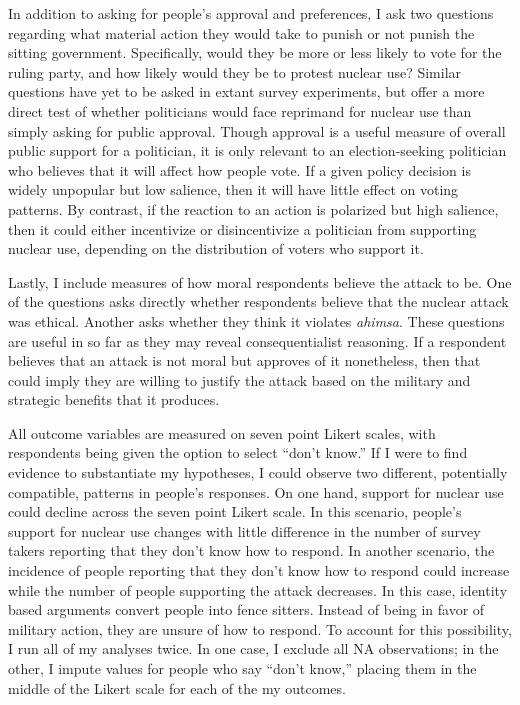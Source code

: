 \documentclass[12pt]{article}
\begin{document}
In addition to asking for people's approval and preferences, I ask two questions regarding what material action they would take to punish or not punish the sitting government. Specifically, would they be more or less likely to vote for the ruling party, and how likely would they be to protest nuclear use? Similar questions have yet to be asked in extant survey experiments, but offer a more direct test of whether politicians would face reprimand for nuclear use than simply asking for public approval. Though approval is a useful measure of overall public support for a politician, it is only relevant to an election-seeking politician who believes that it will affect how people vote. If a given policy decision is widely unpopular but low salience, then it will have little effect on voting patterns. By contrast, if the reaction to an action is polarized but high salience, then it could either incentivize or disincentivize a politician from supporting nuclear use, depending on the distribution of voters who support it. 

Lastly, I include measures of how moral respondents believe the attack to be. One of the questions asks directly whether respondents believe that the nuclear attack was ethical. Another asks whether they think it violates \textit{ahimsa}. These questions are useful in so far as they may reveal consequentialist reasoning. If a respondent believes that an attack is not moral but approves of it nonetheless, then that could imply they are willing to justify the attack based on the military and strategic benefits that it produces.

All outcome variables are measured on seven point Likert scales, with respondents being given the option to select “don't know.” If I were to find evidence to substantiate my hypotheses, I could observe two different, potentially compatible, patterns in people's responses. On one hand, support for nuclear use could decline across the seven point Likert scale. In this scenario, people's support for nuclear use changes with little difference in the number of survey takers reporting that they don't know how to respond. In another scenario, the incidence of people reporting that they don't know how to respond could increase while the number of people supporting the attack decreases. In this case, identity based arguments convert people into fence sitters. Instead of being in favor of military action, they are unsure of how to respond. To account for this possibility, I run all of my analyses twice. In one case, I exclude all NA observations; in the other, I impute values for people who say “don't know,” placing them in the middle of the Likert scale for each of the my outcomes.
\end{document}
